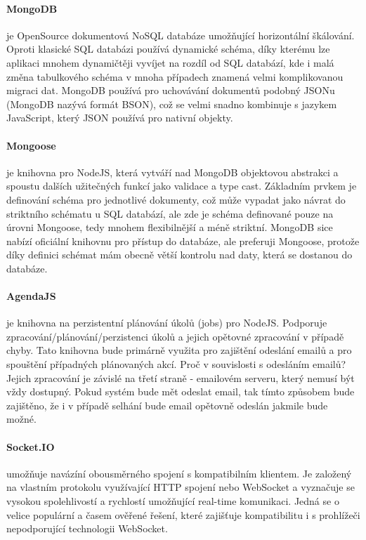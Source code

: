 \paragraph{MongoDB} je OpenSource dokumentová NoSQL databáze umožňující horizontální škálování. Oproti klasické SQL databázi používá dynamické schéma, díky kterému lze aplikaci mnohem dynamičtěji vyvíjet na rozdíl od SQL databází, kde i malá změna tabulkového schéma v mnoha případech znamená velmi komplikovanou migraci dat. MongoDB používá pro uchovávání dokumentů podobný JSONu (MongoDB nazývá formát BSON), což se velmi snadno kombinuje s jazykem JavaScript, který JSON používá pro nativní objekty.

\paragraph{Mongoose} je knihovna pro NodeJS, která vytváří nad MongoDB objektovou abstrakci a spoustu dalších užitečných funkcí jako validace a type cast. Základním prvkem je definování schéma pro jednotlivé dokumenty, což může vypadat jako návrat do striktního schématu u SQL databází, ale zde je schéma definované pouze na úrovni Mongoose, tedy mnohem flexibilnější a méně striktní. MongoDB sice nabízí oficiální knihovnu pro přístup do databáze, ale preferuji Mongoose, protože díky definici schémat mám obecně větší kontrolu nad daty, která se dostanou do databáze.

\paragraph{AgendaJS} je knihovna na perzistentní plánování úkolů (jobs) pro NodeJS. Podporuje zpracování/plánování/perzistenci úkolů a jejich opětovné zpracování v případě chyby. Tato knihovna bude primárně využita pro zajištění odeslání emailů a pro spouštění případných plánovaných akcí. Proč v souvislosti s odesláním emailů? Jejich zpracování je závislé na třetí straně - emailovém serveru, který nemusí být vždy dostupný. Pokud systém bude mět odeslat email, tak tímto způsobem bude zajištěno, že i v případě selhání bude email opětovně odeslán jakmile bude možné.

\paragraph{Socket.IO} umožňuje navázíní obousměrného spojení s kompatibilním klientem. Je založený na vlastním protokolu využívající HTTP spojení nebo WebSocket a vyznačuje se vysokou spolehlivostí a rychlostí umožňující real-time komunikaci. Jedná se o velice populární a časem ověřené řešení, které zajišťuje kompatibilitu i s prohlížeči nepodporující technologii WebSocket.


